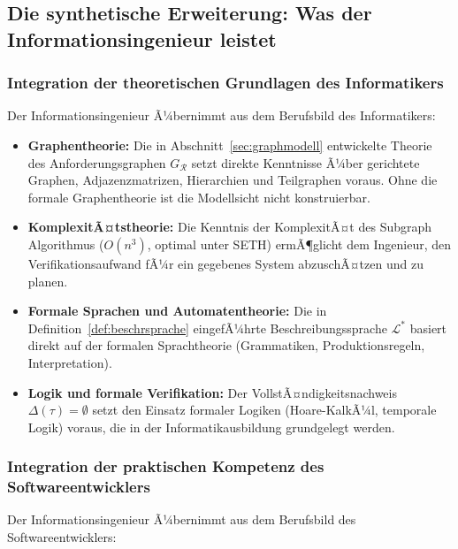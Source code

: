 ﻿\documentclass[a4paper,12pt]{article}
\theoremstyle{definition}
\begin{document}
\subsection{Die synthetische Erweiterung: Was der Informationsingenieur leistet}

\subsubsection{Integration der theoretischen Grundlagen des Informatikers}

Der Informationsingenieur Ã¼bernimmt aus dem Berufsbild des Informatikers:

\begin{itemize}
  \item \textbf{Graphentheorie:} Die in Abschnitt~\ref{sec:graphmodell} entwickelte
        Theorie des Anforderungsgraphen $G_\mathcal{R}$ setzt direkte Kenntnisse
        Ã¼ber gerichtete Graphen, Adjazenzmatrizen, Hierarchien und Teilgraphen voraus.
        Ohne die formale Graphentheorie ist die Modellsicht nicht konstruierbar.
  \item \textbf{KomplexitÃ¤tstheorie:} Die Kenntnis der KomplexitÃ¤t des Subgraph Algorithmus
        ($O(n^3)$, optimal unter SETH) ermÃ¶glicht dem Ingenieur, den Verifikationsaufwand
        fÃ¼r ein gegebenes System abzuschÃ¤tzen und zu planen.
  \item \textbf{Formale Sprachen und Automatentheorie:}
        Die in Definition~\ref{def:beschrsprache} eingefÃ¼hrte Beschreibungssprache
        $\mathcal{L}^*$ basiert direkt auf der formalen Sprachtheorie
        (Grammatiken, Produktionsregeln, Interpretation).
  \item \textbf{Logik und formale Verifikation:}
        Der VollstÃ¤ndigkeitsnachweis $\Delta(\tau) = \emptyset$ setzt den Einsatz
        formaler Logiken (Hoare-KalkÃ¼l, temporale Logik) voraus, die in der
        Informatikausbildung grundgelegt werden.
\end{itemize}

\subsubsection{Integration der praktischen Kompetenz des Softwareentwicklers}

Der Informationsingenieur Ã¼bernimmt aus dem Berufsbild des Softwareentwicklers:
\end{document}
